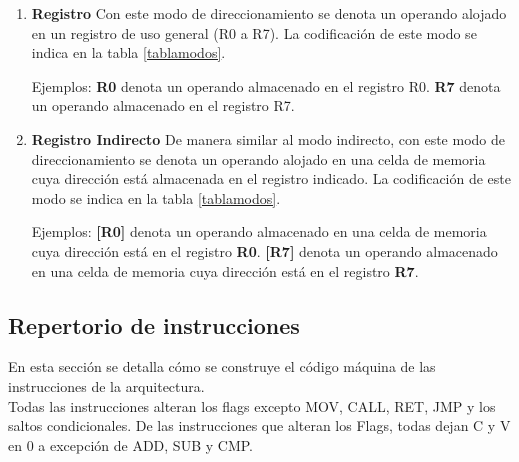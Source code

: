 \begin{enumerate}
\item \textbf{Registro} Con este modo de direccionamiento se denota un operando alojado en un registro de uso general (R0 a R7). La codificación de este modo se indica en la tabla \ref{tablamodos}.

Ejemplos:
\textbf{R0} denota un operando almacenado en el registro R0. 
\textbf{R7} denota un operando almacenado en el registro R7.

\item \textbf{Registro Indirecto} De manera similar al modo indirecto, con este modo de direccionamiento se denota un operando alojado en una celda de memoria cuya dirección está almacenada en el registro indicado. La codificación de este modo se indica en la tabla \ref{tablamodos}.


Ejemplos:
\textbf{[R0]} denota un operando almacenado en una celda de memoria cuya dirección está en el registro \textbf{R0}.
\textbf{[R7]} denota un operando almacenado en una celda de memoria cuya dirección está en el registro \textbf{R7}.

\end{enumerate}


\subsection{Repertorio de instrucciones}
En esta sección se detalla cómo se construye el código máquina de las instrucciones de la arquitectura.\\

Todas las instrucciones alteran los flags excepto MOV, CALL, RET, JMP y los saltos condicionales. De las instrucciones que alteran los Flags, todas dejan C y V en 0 a excepción de ADD, SUB y CMP.  \\


